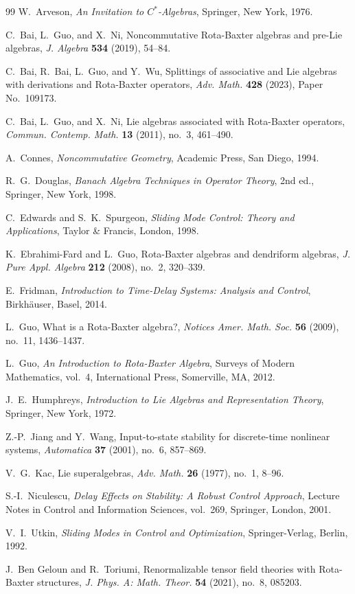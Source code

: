 \documentclass[10pt]{amsart}
\numberwithin{equation}{section}
\begin{document}

\begin{thebibliography}{99}
W.~Arveson, \textit{An Invitation to $C^*$-Algebras}, Springer, New York, 1976.

C.~Bai, L.~Guo, and X.~Ni, Noncommutative Rota-Baxter algebras and pre-Lie algebras,
\textit{J. Algebra} \textbf{534} (2019), 54--84.

C.~Bai, R.~Bai, L.~Guo, and Y.~Wu, Splittings of associative and Lie algebras with
derivations and Rota-Baxter operators, \textit{Adv. Math.} \textbf{428} (2023),
Paper No.~109173.

C.~Bai, L.~Guo, and X.~Ni, Lie algebras associated with Rota-Baxter operators,
\textit{Commun. Contemp. Math.} \textbf{13} (2011), no.~3, 461--490.

A.~Connes, \textit{Noncommutative Geometry}, Academic Press, San Diego, 1994.

R.~G.~Douglas, \textit{Banach Algebra Techniques in Operator Theory}, 2nd ed.,
Springer, New York, 1998.

C.~Edwards and S.~K.~Spurgeon, \textit{Sliding Mode Control: Theory and Applications},
Taylor \& Francis, London, 1998.

K.~Ebrahimi-Fard and L.~Guo, Rota-Baxter algebras and dendriform algebras,
\textit{J. Pure Appl. Algebra} \textbf{212} (2008), no.~2, 320--339.

E.~Fridman, \textit{Introduction to Time-Delay Systems: Analysis and Control},
Birkh\"auser, Basel, 2014.

L.~Guo, What is a Rota-Baxter algebra?, \textit{Notices Amer. Math. Soc.} \textbf{56}
(2009), no.~11, 1436--1437.

L.~Guo, \textit{An Introduction to Rota-Baxter Algebra}, Surveys of Modern Mathematics,
vol.~4, International Press, Somerville, MA, 2012.

J.~E.~Humphreys, \textit{Introduction to Lie Algebras and Representation Theory},
Springer, New York, 1972.

Z.-P.~Jiang and Y.~Wang, Input-to-state stability for discrete-time nonlinear systems,
\textit{Automatica} \textbf{37} (2001), no.~6, 857--869.

V.~G.~Kac, Lie superalgebras, \textit{Adv. Math.} \textbf{26} (1977), no.~1, 8--96.

S.-I.~Niculescu, \textit{Delay Effects on Stability: A Robust Control Approach},
Lecture Notes in Control and Information Sciences, vol.~269, Springer, London, 2001.

V.~I.~Utkin, \textit{Sliding Modes in Control and Optimization}, Springer-Verlag,
Berlin, 1992.

J.~Ben Geloun and R.~Toriumi, Renormalizable tensor field theories with Rota-Baxter
structures, \textit{J. Phys. A: Math. Theor.} \textbf{54} (2021), no.~8, 085203.

\end{thebibliography}
\end{document}
